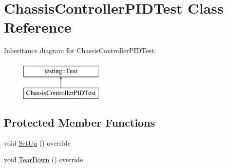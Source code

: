 \hypertarget{classChassisControllerPIDTest}{}\section{Chassis\+Controller\+P\+I\+D\+Test Class Reference}
\label{classChassisControllerPIDTest}
Inheritance diagram for Chassis\+Controller\+P\+I\+D\+Test\+:\begin{figure}[H]
\begin{center}
\leavevmode
\includegraphics[height=2.000000cm]{classChassisControllerPIDTest}
\end{center}
\end{figure}
\subsection*{Protected Member Functions}
\begin{DoxyCompactItemize}
\item 
void \mbox{\hyperlink{classChassisControllerPIDTest_a6504206d2aa7e3984e5f23177507935f}{Set\+Up}} () override
\item 
void \mbox{\hyperlink{classChassisControllerPIDTest_adb3cad516288f90a2a843086d478d1bc}{Tear\+Down}} () override
\end{DoxyCompactItemize}
